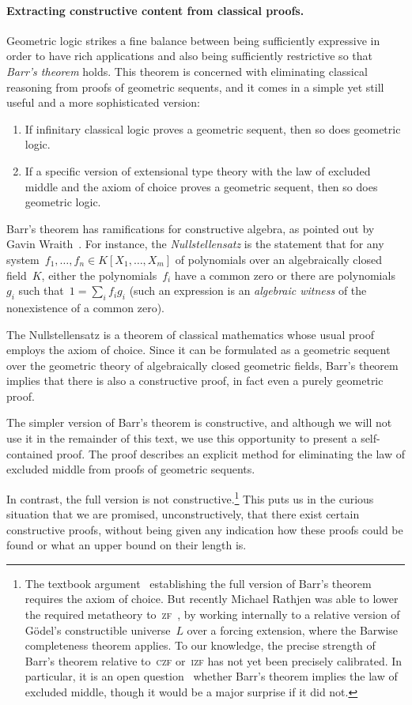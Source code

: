 \documentclass{ws-rv9x6}
\begin{document}
{\paragraph{Extracting constructive content from classical proofs.}\label{par:barr}
Geometric logic strikes a fine balance between being sufficiently expressive in order to
have rich applications and also being sufficiently restrictive so that \emph{Barr's
theorem} holds. This theorem is concerned with eliminating classical reasoning
from proofs of geometric sequents, and it comes in a simple yet still useful
and a more sophisticated version:
\begin{enumerate}
\item If infinitary classical logic proves a geometric sequent, then so does
geometric logic.
\item If a specific version of extensional type theory with the law of excluded
middle and the axiom of choice proves a geometric sequent, then so does
geometric logic.
\end{enumerate}
Barr's theorem has ramifications for constructive algebra, as pointed out by
Gavin Wraith~\cite{wraith:intuitionistic-algebra}.
For instance, the \emph{Nullstellensatz} is the statement that for any
system~$f_1,\ldots,f_n \in K[X_1,\ldots,X_m]$ of polynomials over an
algebraically closed field~$K$, either the polynomials~$f_i$ have a common zero
or there are polynomials~$g_i$ such that~$1 = \sum_i f_i g_i$ (such an
expression is an \emph{algebraic witness} of the nonexistence of a common
zero).

The Nullstellensatz is a theorem of classical mathematics whose usual proof employs the
axiom of choice. Since it can be formulated as a geometric sequent over the
geometric theory of algebraically closed geometric fields, Barr's theorem
implies that there is also a constructive proof, in fact even a purely
geometric proof.

The simpler version of Barr's theorem is constructive, and although we will not
use it in the remainder of this text, we use this opportunity to present a
self-contained proof. The proof describes an explicit method for eliminating
the law of excluded middle from proofs of geometric sequents.

In contrast, the full version is not constructive.\footnote{%
The textbook argument~\cite[Theorem~7.57]{johnstone:topos-theory} establishing
the full version of Barr's theorem requires the axiom of choice. But recently
Michael Rathjen was able to lower the required metatheory
to~\textsc{zf}~\cite[Remark~4.2]{rathjen:barr}, by working internally to a
relative version of Gödel's constructible universe~$L$ over a forcing
extension, where the Barwise completeness theorem applies. To our knowledge,
the precise strength of Barr's theorem relative to~\textsc{czf} or~\textsc{izf}
has not yet been precisely calibrated. In particular, it is an open
question~\cite{henry:question-barr} whether Barr's theorem implies the law of
excluded middle, though it would be a major surprise if it did not.}
This puts us in the curious situation that we are promised, unconstructively,
that there exist certain constructive proofs, without being given any indication how
these proofs could be found or what an upper bound on their length is.

}
\end{document}
